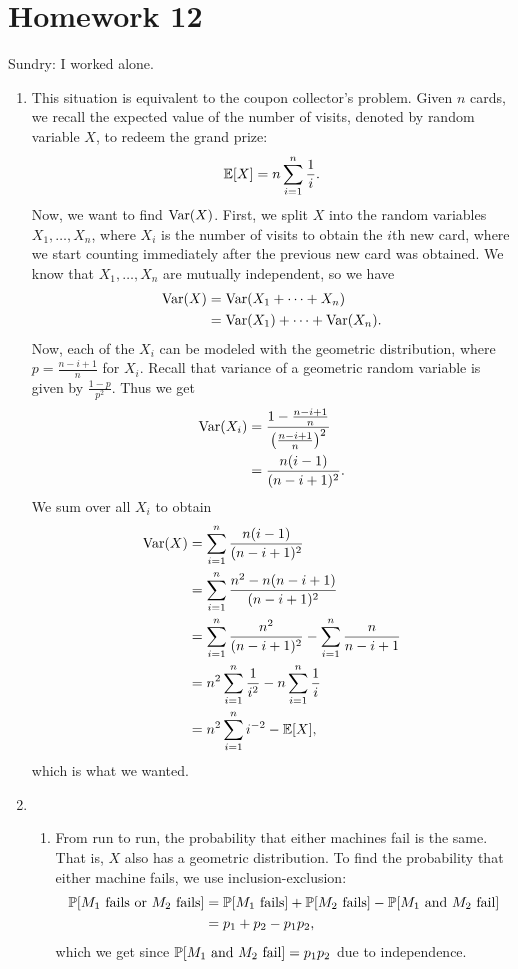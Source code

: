 \section{Homework 12}
Sundry: I worked alone.

\begin{enumerate}
    \item This situation is equivalent to the coupon collector's problem. Given $n$ cards, we recall the expected value of the number of visits, denoted by random variable $X$, to redeem the grand prize:
    \[
    \mathbb{E}[X] = n\sum\limits_{i = 1}^n\frac{1}{i}.
    \]
    Now, we want to find $\text{Var}(X)$. First, we split $X$ into the random variables $X_1, \dots, X_n$, where $X_i$ is the number of visits to obtain the $i$th new card, where we start counting immediately after the previous new card was obtained. We know that $X_1, \dots, X_n$ are mutually independent, so we have
    \begin{align*}
        \text{Var}(X) &= \text{Var}(X_1 + \dots + X_n) \\
            &= \text{Var}(X_1) + \dots + \text{Var}(X_n).
    \end{align*}
    Now, each of the $X_i$ can be modeled with the geometric distribution, where $p = \frac{n - i + 1}{n}$ for $X_i$. Recall that variance of a geometric random variable is given by $\frac{1 - p}{p^2}$. Thus we get
    \begin{align*}
        \text{Var}(X_i) &= \frac{1 - \frac{n - i + 1}{n}}{\left(\frac{n - i + 1}{n}\right)^2} \\
            &= \frac{n(i - 1)}{(n - i + 1)^2}.
    \end{align*}
    We sum over all $X_i$ to obtain
    \begin{align*}
        \text{Var}(X) &= \sum\limits_{i = 1}^n \frac{n(i - 1)}{(n - i + 1)^2} \\
            &= \sum\limits_{i = 1}^n\frac{n^2 - n(n - i + 1)}{(n - i + 1)^2} \\
            &= \sum\limits_{i = 1}^n\frac{n^2}{(n - i + 1)^2} - \sum\limits_{i = 1}^n\frac{n}{n - i + 1} \\
            &= n^2\sum\limits_{i = 1}^n\frac{1}{i^2} - n\sum\limits_{i = 1}^n\frac{1}{i} \\
            &= n^2\sum\limits_{i = 1}^ni^{-2} - \mathbb{E}[X],
    \end{align*}
    which is what we wanted.
    
    \item \begin{enumerate}
        \item From run to run, the probability that either machines fail is the same. That is, $X$ also has a geometric distribution. To find the probability that either machine fails, we use inclusion-exclusion:
        \begin{align*}
            \mathbb{P}[M_1 \text{ fails or } M_2 \text{ fails}] &= \mathbb{P}[M_1 \text{ fails}] + \mathbb{P}[M_2 \text{ fails}] - \mathbb{P}[M_1 \text{ and } M_2 \text{ fail}] \\
                &= p_1 + p_2 - p_1p_2,
        \end{align*}
        which we get since $\mathbb{P}[M_1 \text{ and } M_2 \text{ fail}] = p_1p_2$ due to independence.
        

\end{enumerate}
\end{enumerate}
